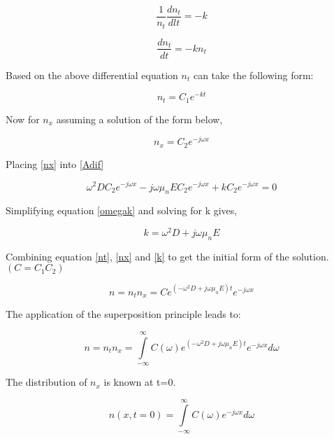 \begin{doublespace}
\begin{equation}
\nonumber
\frac{1}{n_{t}}\frac{d n_{t}}{dl t}=-k
\end{equation}

\begin{equation}
\nonumber
\frac{d n_{t}}{d t}=-kn_t
\end{equation}

Based on the above differential equation $n_t$ can take the following form:

\begin{equation}
n_t=C_1 e^{-kt}
\label{nt}
\end{equation}

Now for $n_x$ assuming a solution of the form below,

\begin{equation}
n_x=C_2 e^{-j\omega x}
\label{nx}
\end{equation}

Placing \eqref{nx} into \eqref{Adif}

\begin{equation}
\omega^2 D C_2 e^{-j\omega x}-j\omega \mu_n E C_2 e^{-j\omega x}+kC_2e^{-j\omega x}=0
\label{omegak}
\end{equation}

Simplifying equation \eqref{omegak} and solving for k gives,

\begin{equation}
k=\omega^2 D+j\omega \mu_n E
\label{k}
\end{equation}

Combining equation \eqref{nt}, \eqref{nx} and \eqref{k} to get the initial form of the solution. $(C=C_1C_2)$

\begin{equation}
n=n_tn_x=Ce^{(-\omega^2 D + j\omega \mu_n E)t} e^{-j\omega x}
\end{equation}

The application of the superposition principle leads to:

\begin{equation}
n=n_tn_x=\int\limits_{-\infty}^{\infty}C(\omega)e^{(-\omega^2 D + j\omega \mu_n E)t} e^{-j\omega x}d\omega
\label{nfinal1}
\end{equation}

The distribution of $n_x$ is known at t=0.

\begin{equation}
n(x,t=0)=\int\limits_{-\infty}^{\infty}C(\omega) e^{-j\omega x}d\omega
\end{equation}


\end{doublespace}
